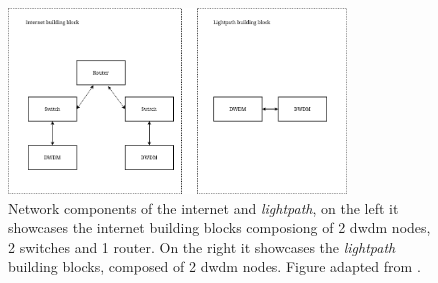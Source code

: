 
\begin{figure}[h] 
    \centering
    \includegraphics[width=0.8\textwidth]{figs/taal2014.png}
    \caption[Network components of the internet and \textit{lightpath}] {Network components of the internet and \textit{lightpath}, on the left it showcases the internet building blocks composiong of 2 \ac{dwdm} nodes, 2 switches and 1 router. On the right it showcases the \textit{lightpath} building blocks, composed of 2 \ac{dwdm} nodes. Figure adapted from \citet{Taal2014}.}
    \label{figure:tall2014_network_components}
\end{figure}

